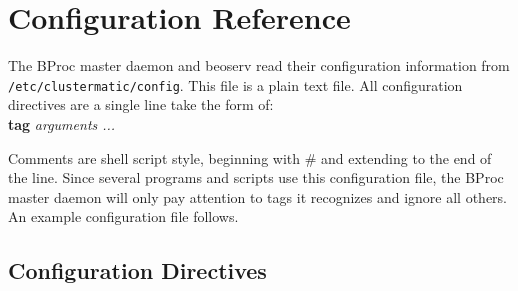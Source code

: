 \chapter{Configuration Reference}

The BProc master daemon and beoserv read their configuration
information from \texttt{/etc/clustermatic/config}.  This file is a plain
text file.  All configuration directives are a single line take the
form of:\\
\textbf{tag} \textit{arguments ...}

Comments are shell script style, beginning with \# and extending to the
end of the line.  Since several programs and scripts use this
configuration file, the BProc master daemon will only pay attention to
tags it recognizes and ignore all others.  An example configuration
file follows.

\section{Configuration Directives}

